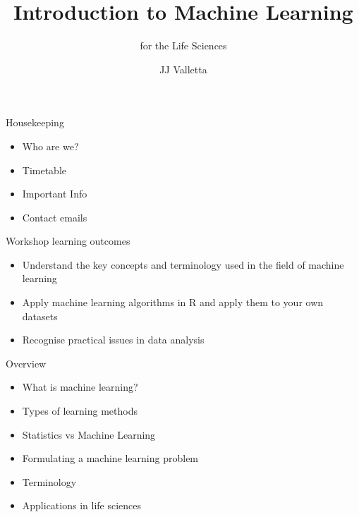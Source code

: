 \documentclass[pdf]{beamer}
\title{Introduction to Machine Learning}
\subtitle{for the Life Sciences}
\author{JJ Valletta}
\newif\ifplacelogo %
\begin{document}
\begin{frame}
\titlepage
\end{frame}
\begin{frame}{Housekeeping}
\begin{itemize}
	\item Who are we?
	\item Timetable
	\item Important Info
	\item Contact emails
\end{itemize}
\end{frame}
\begin{frame}{Workshop learning outcomes}
\begin{itemize}\addtolength{\itemsep}{0.5\baselineskip}
	\item Understand the key concepts and terminology used in the field of machine learning
	\item Apply machine learning algorithms in R and apply them to your own datasets
	\item Recognise practical issues in data analysis
\end{itemize}
\end{frame}
\placelogofalse %
\begin{frame}{Overview}
\begin{itemize}\addtolength{\itemsep}{0.5\baselineskip}
	\item<2-> What is machine learning?
	\item<3-> Types of learning methods
	\item<4-> Statistics vs Machine Learning
	\item<5-> Formulating a machine learning problem
	\item<6-> Terminology
	\item<7-> Applications in life sciences
\end{itemize}
\end{frame}
\end{document}
